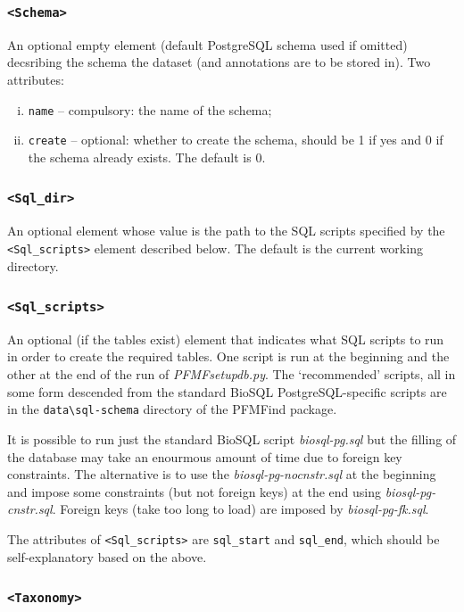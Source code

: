 \documentclass[11pt]{article}
\begin{document}
\subsubsection*{{\tt <Schema>}}

An optional empty element (default PostgreSQL schema used if omitted) decsribing the schema the dataset (and annotations are to be stored in). Two attributes:
\begin{enumerate}[(i)]
\item {\tt name} -- compulsory: the name of the schema;
\item {\tt create} -- optional: whether to create the schema, should be 1 if yes and 0 if the schema already exists. The default is 0.
\end{enumerate}

\subsubsection*{{\tt <Sql\_dir>}}

An optional element whose value is the path to the SQL scripts specified by the {\tt <Sql\_scripts>} element described below. The default is the current working directory.

\subsubsection*{{\tt <Sql\_scripts>}}

An optional (if the tables exist) element that indicates what SQL scripts to run in order to create the required tables. One script is run at the beginning and the other at the end of the run of {\it PFMFsetupdb.py}. The `recommended' scripts, all in some form descended from the standard BioSQL PostgreSQL-specific scripts are in the \verb|data\sql-schema| directory of the PFMFind package.

It is possible to run just the standard BioSQL script {\it biosql-pg.sql} but the filling of the database  may take an enourmous amount of time due to foreign key constraints. The alternative is to use the {\it biosql-pg-nocnstr.sql} at the beginning and impose some constraints (but not foreign keys) at the end using {\it biosql-pg-cnstr.sql}. Foreign keys (take too long to load) are imposed by {\it biosql-pg-fk.sql}. 

The attributes of {\tt <Sql\_scripts>} are {\tt sql\_start} and {\tt sql\_end}, which should be self-explanatory based on the above.

\subsubsection*{{\tt <Taxonomy>}}
\end{document}
